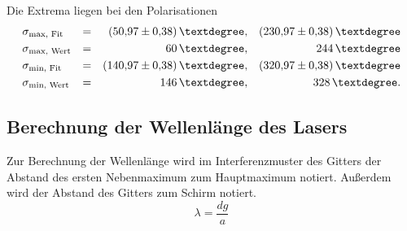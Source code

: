 %
Die Extrema liegen bei den Polarisationen
\begin{align*}
  &\sigma_{\text{max, Fit}} &=&& \SI{50.97 \pm 0.38}{°},   && \SI{230.97 \pm 0.38}{°} \\
  &\sigma_{\text{max, Wert}} &=&& \SI{ 60 }{°},                          && \SI{ 244 }{°} \\
  &\sigma_{\text{min, Fit}} &=&& \SI{140.97 \pm 0.38}{°},  && \SI{320.97 \pm 0.38}{°} \\
  &\sigma_{\text{min, Wert}} &=&& \SI{ 146 }{°},                         && \SI{ 328 }{°}. \\
\end{align*}
\FloatBarrier

\subsection{Berechnung der Wellenlänge des Lasers}
Zur Berechnung der Wellenlänge wird im Interferenzmuster des Gitters der Abstand des ersten Nebenmaximum zum Hauptmaximum notiert.
Außerdem wird der Abstand des Gitters zum Schirm notiert.
\begin{equation*}
    \lambda = \frac{d g}{a}
\end{equation*}
